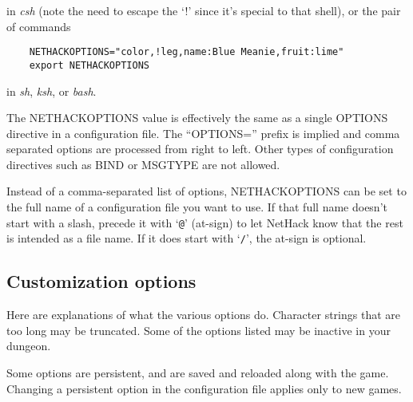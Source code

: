 \nd in {\it csh}
(note the need to escape the `!' since it's special
to that shell), or the pair of commands
\begin{verbatim}
    NETHACKOPTIONS="color,!leg,name:Blue Meanie,fruit:lime"
    export NETHACKOPTIONS
\end{verbatim}

\nd in {\it sh}, {\it ksh}, or {\it bash}.

The NETHACKOPTIONS value is effectively the same as a single OPTIONS
directive in a configuration file.
The ``OPTIONS='' prefix is implied and comma separated options are
processed from right to left.
Other types of configuration directives such as BIND or MSGTYPE are
not allowed.

Instead of a comma-separated list of options,
NETHACKOPTIONS can be set to the full name of a configuration file you
want to use.
If that full name doesn't start with a slash, precede it with `{\tt @}'
(at-sign) to let NetHack know that the rest is intended as a file name.
If it does start with `{\tt /}', the at-sign is optional.

\subsection*{Customization options}

Here are explanations of what the various options do.
Character strings that are too long may be truncated.
Some of the options listed may be inactive in your dungeon.

Some options are persistent, and are saved and reloaded along with
the game.  Changing a persistent option in the configuration file
applies only to new games.

